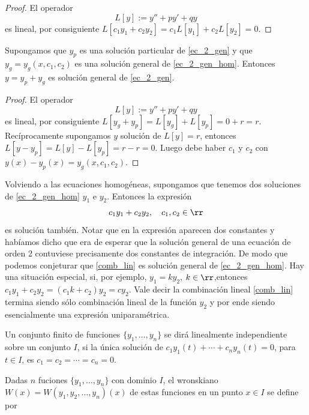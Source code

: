 \begin{proof}
 El operador
\[L[y]:=y''+py'+qy\]
es lineal, por consiguiente
$L[c_1y_1+c_2y_2]=c_1L[y_1]+c_2L[y_2]=0.$
\end{proof}


\begin{teorema}{}
 Supongamos que $y_p$ es una solución particular de \eqref{ec_2_gen} y que $y_g=y_g(x,c_1,c_2)$ es una solución
general de \eqref{ec_2_gen_hom}. Entonces $y=y_p+y_g$ es solución general de \eqref{ec_2_gen}.
\end{teorema}



\begin{proof}
El operador
\[L[y]:=y''+py'+qy\]
es lineal, por consiguiente
$L[y_g+y_p]=L[y_g]+L[y_p]=0+r=r.$
Recíprocamente supongamos $y$ solución de $L[y]=r$, entonces
$L[y-y_p]=L[y]-L[y_p]=r-r=0.$
Luego debe haber $c_1$ y $c_2$ con $y(x)-y_p(x)=y_g(x,c_1,c_2)$.

\end{proof}


Volviendo a las ecuaciones homogéneas, supongamos que tenemos dos soluciones de \eqref{ec_2_gen_hom} $y_1$ e $y_2$. Entonces la expresión
\begin{equation}\label{comb_lin}
c_1y_1+c_2y_2,\quad c_1,c_2\in\rr
\end{equation}
es solución también. Notar que en la expresión aparecen dos constantes y habíamos dicho que era de esperar que la solución general de una ecuación de orden 2 contuviese
precisamente dos constantes de integración. De modo que podemos conjeturar que \eqref{comb_lin} es solución general de \eqref{ec_2_gen_hom}.
Hay una situación especial, si, por ejemplo, $y_1=ky_2$, $k\in\rr$,entonces $c_1y_1+c_2y_2=(c_1k+c_2)y_2=cy_2$. Vale decir la combinación lineal \eqref{comb_lin}
termina siendo sólo combinación lineal de la función $y_2$ y por ende siendo esencialmente una expresión uniparamétrica.

\begin{definicion}{}
 Un conjunto finito de funciones $\{y_1,\ldots,y_n\}$ se dirá linealmente independiente sobre un conjunto $I$,
si la única solución de $c_1y_1(t)+\cdots+c_ny_n(t)=0$, para $t\in I$, es $c_1=c_2=\cdots=c_n=0$.
\end{definicion}




\begin{definicion}{}
 Dadas $n$ fuciones $\{y_1,\ldots,y_n\}$ con dominio $I$, el wronskiano $W(x)=W(y_1,y_2,\ldots,y_n)(x)$ de estas funciones en un punto $x\in I$ se define por
\end{definicion}




